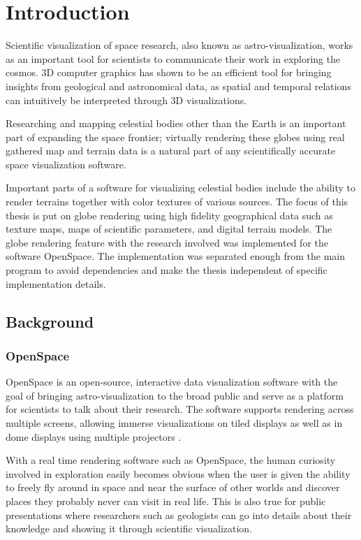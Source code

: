 \chapter{Introduction}

Scientific visualization of space research, also known as astro-visualization, works as an important tool for scientists to communicate their work in exploring the cosmos. 3D computer graphics has shown to be an efficient tool for bringing insights from geological and astronomical data, as spatial and temporal relations can intuitively be interpreted through 3D visualizations.

Researching and mapping celestial bodies other than the Earth is an important part of expanding the space frontier; virtually rendering these globes using real gathered map and terrain data is a natural part of any scientifically accurate space visualization software.

Important parts of a software for visualizing celestial bodies include the ability to render terrains together with color textures of various sources. The focus of this thesis is put on globe rendering using high fidelity geographical data such as texture maps, maps of scientific parameters, and digital terrain models. The globe rendering feature with the research involved was implemented for the software OpenSpace. The implementation was separated enough from the main program to avoid dependencies and make the thesis independent of specific implementation details. 

\section{Background}

\subsection{OpenSpace}

OpenSpace is an open-source, interactive data visualization software with the goal of bringing astro-visualization to the broad public and serve as a platform for scientists to talk about their research. The software supports rendering across multiple screens, allowing immerse visualizations on tiled displays as well as in dome displays using multiple projectors \cite{openspace}.

With a real time rendering software such as OpenSpace, the human curiosity involved in exploration easily becomes obvious when the user is given the ability to freely fly around in space and near the surface of other worlds and discover places they probably never can visit in real life. This is also true for public presentations where researchers such as geologists can go into details about their knowledge and showing it through scientific visualization.

